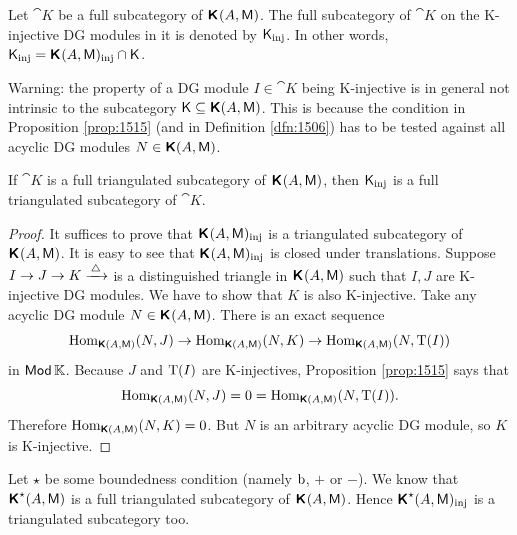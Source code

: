 \begin{dfn} \label{dfn:1509}
Let $\cat{K}$ be a full subcategory of $\boldsymbol{\mathsf{K}}^{}(A, \operatorname{\mathsf{M}})$. 
The full subcategory of  $\cat{K}$ on the K-injective DG modules in it is 
denoted by $\operatorname{\mathsf{K}}_{\mathrm{inj}}$. In other words, 
$\operatorname{\mathsf{K}}_{\mathrm{inj}} = \boldsymbol{\mathsf{K}}^{}(A, \operatorname{\mathsf{M}})_{\mathrm{inj}} \cap \operatorname{\mathsf{K}}$.
\end{dfn}

\begin{rem} \label{rem:5050}
Warning: the property of a DG module $I \in \cat{K}$ being K-injective is in 
general not intrinsic to the subcategory 
$\operatorname{\mathsf{K}} \subseteq \boldsymbol{\mathsf{K}}(A, \operatorname{\mathsf{M}})$. This is because the 
condition in Proposition \ref{prop:1515} (and in Definition \ref{dfn:1506}) 
has to be tested against all acyclic DG modules 
$N \in \boldsymbol{\mathsf{K}}(A, \operatorname{\mathsf{M}})$.
\end{rem}

\begin{prop}  \label{prop:130}
If  $\cat{K}$ is a full triangulated subcategory of
$\boldsymbol{\mathsf{K}}^{}(A, \operatorname{\mathsf{M}})$, then $\operatorname{\mathsf{K}}_{\mathrm{inj}}$ is a full triangulated 
subcategory of $\cat{K}$.
\end{prop}

\begin{proof}
It suffices to prove that 
$\boldsymbol{\mathsf{K}}^{}(A, \operatorname{\mathsf{M}})_{\mathrm{inj}}$ is a 
triangulated subcategory of $\boldsymbol{\mathsf{K}}^{}(A, \operatorname{\mathsf{M}})$.
It is easy to see that $\boldsymbol{\mathsf{K}}^{}(A, \operatorname{\mathsf{M}})_{\textup{inj}}$ is closed under
translations. Suppose 
$I \to J \to K \xrightarrow{\, \triangle\, }$
is a distinguished triangle in $\boldsymbol{\mathsf{K}}^{}(A, \operatorname{\mathsf{M}})$ such that  
$I, J$ are K-injective DG modules. We have to show that $K$ is also
K-injective. Take any acyclic DG module $N \in \boldsymbol{\mathsf{K}}^{}(A, \operatorname{\mathsf{M}})$. 
There is an exact sequence
\[ \operatorname{Hom}_{\boldsymbol{\mathsf{K}}(A, \operatorname{\mathsf{M}})}(N, J) \to 
\operatorname{Hom}_{\boldsymbol{\mathsf{K}}(A, \operatorname{\mathsf{M}})}(N, K)
\to \operatorname{Hom}_{\boldsymbol{\mathsf{K}}(A, \operatorname{\mathsf{M}})}(N, \operatorname{T}(I))  \]
in $\operatorname{\mathsf{Mod}} \mathbb{K}$. Because $J$ and $\operatorname{T}(I)$ are 
K-injectives, Proposition \ref{prop:1515} says that
\[ \operatorname{Hom}_{\boldsymbol{\mathsf{K}}(A, \operatorname{\mathsf{M}})}(N, J) = 0 = 
\operatorname{Hom}_{\boldsymbol{\mathsf{K}}(A, \operatorname{\mathsf{M}})}(N, \operatorname{T}(I)) . \]
Therefore 
$\operatorname{Hom}_{\boldsymbol{\mathsf{K}}(A, \operatorname{\mathsf{M}})}(N, K) = 0$. 
But $N$ is an arbitrary acyclic DG module, so $K$ is K-injective.
\end{proof}

\begin{exa} \label{exa:1520}
Let $\star$ be some boundedness condition (namely $\mathrm{b}$, $+$ or $-$). 
We know that $\boldsymbol{\mathsf{K}}^{\star}(A, \operatorname{\mathsf{M}})$ 
is a full triangulated subcategory of $\boldsymbol{\mathsf{K}}^{}(A, \operatorname{\mathsf{M}})$.
Hence $\boldsymbol{\mathsf{K}}^{\star}(A, \operatorname{\mathsf{M}})_{\mathrm{inj}}$
is a triangulated subcategory too.  
\end{exa}

